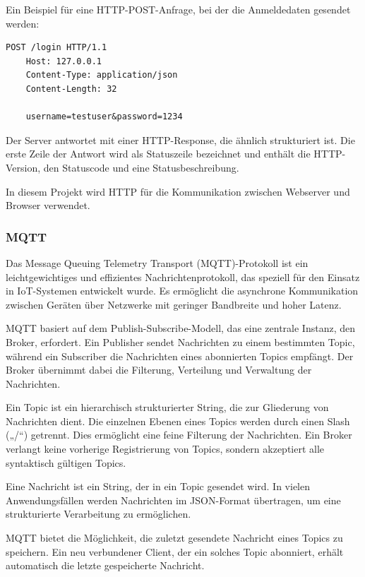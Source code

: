\documentclass[12pt, letterpaper]{article}
\begin{document}
  \par Ein Beispiel für eine HTTP-POST-Anfrage, bei der die Anmeldedaten gesendet werden:
  \begin{Verbatim}[frame=single]
    POST /login HTTP/1.1  
    Host: 127.0.0.1  
    Content-Type: application/json
    Content-Length: 32  

    username=testuser&password=1234 
  \end{Verbatim}
  \par Der Server antwortet mit einer HTTP-Response, die ähnlich strukturiert ist. Die erste Zeile der Antwort wird als Statuszeile bezeichnet und enthält die HTTP-Version, den Statuscode und eine Statusbeschreibung.
  \par In diesem Projekt wird HTTP für die Kommunikation zwischen Webserver und Browser verwendet.
  \subsubsection{MQTT}
  \par Das Message Queuing Telemetry Transport (MQTT)-Protokoll \cite{mqtt} ist ein leichtgewichtiges und effizientes Nachrichtenprotokoll, das speziell für den Einsatz in IoT-Systemen entwickelt wurde. Es ermöglicht die asynchrone Kommunikation zwischen Geräten über Netzwerke mit geringer Bandbreite und hoher Latenz.
  \par MQTT basiert auf dem Publish-Subscribe-Modell, das eine zentrale Instanz, den Broker, erfordert. Ein Publisher sendet Nachrichten zu einem bestimmten Topic, während ein Subscriber die Nachrichten eines abonnierten Topics empfängt. Der Broker übernimmt dabei die Filterung, Verteilung und Verwaltung der Nachrichten.
  \par Ein Topic ist ein hierarchisch strukturierter String,  die zur Gliederung von Nachrichten dient. Die einzelnen Ebenen eines Topics werden durch einen Slash („/“) getrennt. Dies ermöglicht eine feine Filterung der Nachrichten. Ein Broker verlangt keine vorherige Registrierung von Topics, sondern akzeptiert alle syntaktisch gültigen Topics.
  \par Eine Nachricht ist ein String, der in ein Topic gesendet wird. In vielen Anwendungsfällen werden Nachrichten im JSON-Format übertragen, um eine strukturierte Verarbeitung zu ermöglichen.
  \par MQTT bietet die Möglichkeit, die zuletzt gesendete Nachricht eines Topics zu speichern. Ein neu verbundener Client, der ein solches Topic abonniert, erhält automatisch die letzte gespeicherte Nachricht.
\end{document}
